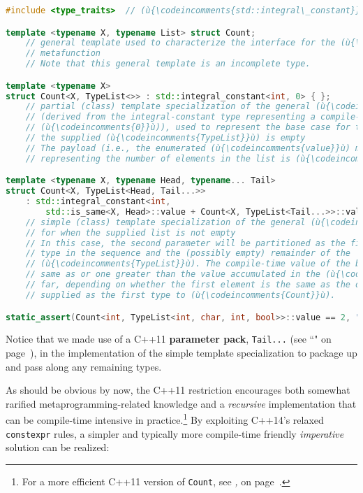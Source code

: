 \begin{lstlisting}[language=C++,label={relaxedconstexpr-countcode}]
#include <type_traits>  // (ù{\codeincomments{std::integral\_constant}}ù), (ù{\codeincomments{std::is\_same}}ù)

template <typename X, typename List> struct Count;
    // general template used to characterize the interface for the (ù{\codeincomments{Count}}ù)
    // metafunction
    // Note that this general template is an incomplete type.

template <typename X>
struct Count<X, TypeList<>> : std::integral_constant<int, 0> { };
    // partial (class) template specialization of the general (ù{\codeincomments{Count}}ù) template
    // (derived from the integral-constant type representing a compile-time
    // (ù{\codeincomments{0}}ù)), used to represent the base case for the recursion --- i.e., when
    // the supplied (ù{\codeincomments{TypeList}}ù) is empty
    // The payload (i.e., the enumerated (ù{\codeincomments{value}}ù) member of the base class)
    // representing the number of elements in the list is (ù{\codeincomments{0}}ù).

template <typename X, typename Head, typename... Tail>
struct Count<X, TypeList<Head, Tail...>>
    : std::integral_constant<int,
        std::is_same<X, Head>::value + Count<X, TypeList<Tail...>>::value> { };
    // simple (class) template specialization of the general (ù{\codeincomments{count}}ù) template
    // for when the supplied list is not empty
    // In this case, the second parameter will be partitioned as the first
    // type in the sequence and the (possibly empty) remainder of the
    // (ù{\codeincomments{TypeList}}ù). The compile-time value of the base class will be either the
    // same as or one greater than the value accumulated in the (ù{\codeincomments{TypeList}}ù) so
    // far, depending on whether the first element is the same as the one
    // supplied as the first type to (ù{\codeincomments{Count}}ù).

static_assert(Count<int, TypeList<int, char, int, bool>>::value == 2, "");
\end{lstlisting}

\noindent Notice that we made use of a C++11 \textbf{parameter pack},
\texttt{Tail...} (see ``" on page~\pageref{variadictemplate}), in the
implementation of the simple template specialization to package up and
pass along any remaining types.

As should be obvious by now, the C++11 restriction encourages both
somewhat rarified metaprogramming-related knowledge and a
\emph{recursive} implementation that can be compile-time intensive in
practice.{\cprotect\footnote{For a more efficient C++11 version of
\texttt{Count}, see \textit{, } on page~\pageref{constexpr-typelist-count-algorithm}.}} By exploiting C++14's relaxed
\texttt{constexpr} rules, a simpler and typically more compile-time
friendly \emph{imperative} solution can be realized:

